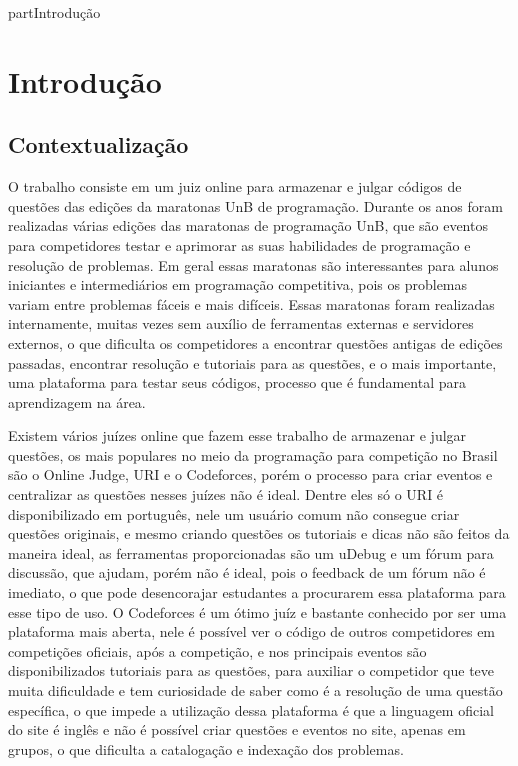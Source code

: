 part{Introdução}

\chapter[Introdução]{Introdução}

\section{Contextualização}

O trabalho consiste em um juiz online para armazenar e julgar códigos de questões das edições da
maratonas UnB de programação.
Durante os anos foram realizadas várias edições das maratonas de programação UnB, que são eventos
para competidores testar e aprimorar as suas habilidades de programação e resolução de problemas.
Em geral essas maratonas são interessantes para alunos iniciantes e intermediários em programação
competitiva, pois os problemas variam entre problemas fáceis e mais difíceis. Essas maratonas foram
realizadas internamente, muitas vezes sem auxílio de ferramentas externas e servidores externos, o
que dificulta os competidores a encontrar questões antigas de edições passadas, encontrar resolução
e tutoriais para as questões, e o mais importante, uma plataforma para testar seus códigos,
processo que é fundamental para aprendizagem na área.

Existem vários juízes online que fazem esse trabalho de armazenar e julgar questões, os mais
populares no meio da programação para competição no Brasil são o Online Judge, URI e o Codeforces,
porém o processo para criar eventos e centralizar as questões nesses juízes não é ideal. Dentre
eles só o URI é disponibilizado em português, nele um usuário comum não consegue criar questões
originais, e mesmo criando questões os tutoriais e dicas não são feitos da maneira ideal, as
ferramentas proporcionadas são um uDebug e um fórum para discussão, que ajudam, porém não é ideal,
pois o feedback de um fórum não é imediato, o que pode desencorajar estudantes a procurarem essa
plataforma para esse tipo de uso. O Codeforces é um ótimo juíz e bastante conhecido por ser uma
plataforma mais aberta, nele é possível ver o código de outros competidores em competições
oficiais, após a competição, e nos principais eventos são disponibilizados tutoriais para as
questões, para auxiliar o competidor que teve muita dificuldade e tem curiosidade de saber como é a
resolução de uma questão específica, o que impede a utilização dessa plataforma é que a linguagem
oficial do site é inglês e não é possível criar questões e eventos no site, apenas em grupos, o que
dificulta a catalogação e indexação dos problemas.

